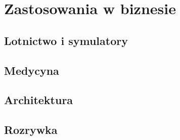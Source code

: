 \chapter{Zastosowania w biznesie}
\label{ch:biznes}

\section{Lotnictwo i symulatory}
\label{sec:lotnictwo}

\section{Medycyna}
\label{sec:medycyna}

\section{Architektura}
\label{sec:architektura}

\section{Rozrywka}
\label{sec:gry}